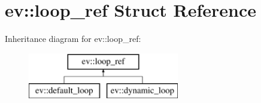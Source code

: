 \hypertarget{structev_1_1loop__ref}{}\section{ev\+:\+:loop\+\_\+ref Struct Reference}
\label{structev_1_1loop__ref}
Inheritance diagram for ev\+:\+:loop\+\_\+ref\+:\begin{figure}[H]
\begin{center}
\leavevmode
\includegraphics[height=2.000000cm]{structev_1_1loop__ref}
\end{center}
\end{figure}
